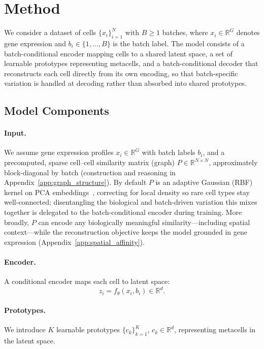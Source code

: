 \section{Method}
\label{sec:method}

We consider a dataset of cells $\{x_i\}_{i=1}^N$ with $B \geq 1$ batches, where $x_i \in \mathbb{R}^G$ denotes gene expression and $b_i \in \{1, \dots, B\}$ is the batch label. The model consists of a batch-conditional encoder mapping cells to a shared latent space, a set of learnable prototypes representing metacells, and a batch-conditional decoder that reconstructs each cell directly from its own encoding, so that batch-specific variation is handled at decoding rather than absorbed into shared prototypes.

\subsection{Model Components}

\paragraph{Input.}
We assume gene expression profiles $x_i \in \mathbb{R}^G$ with batch labels $b_i$, and a precomputed, sparse cell--cell similarity matrix (graph) $P \in \mathbb{R}^{N \times N}$, approximately block-diagonal by batch (construction and reasoning in Appendix~\ref{app:graph_structure}). By default $P$ is an adaptive Gaussian (RBF) kernel on PCA embeddings~\citep{seacells}, correcting for local density so rare cell types stay well-connected; disentangling the biological and batch-driven variation this mixes together is delegated to the batch-conditional encoder during training. More broadly, $P$ can encode any biologically meaningful similarity---including spatial context---while the reconstruction objective keeps the model grounded in gene expression (Appendix~\ref{app:spatial_affinity}).

\paragraph{Encoder.}
A conditional encoder maps each cell to latent space:
\begin{equation}
z_i = f_\theta(x_i, b_i) \in \mathbb{R}^d.
\end{equation}

\paragraph{Prototypes.}
We introduce $K$ learnable prototypes $\{c_k\}_{k=1}^K$, $c_k \in \mathbb{R}^d$, representing metacells in the latent space.

